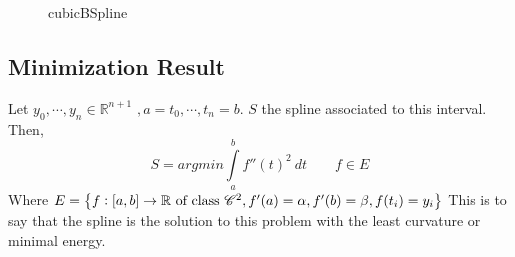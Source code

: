 \begin{figure}[ht]
    \centering
    \caption{cubicBSpline}
    \label{fig:cubicbspline}
\end{figure}

\subsection{Minimization Result}
\label{subsec:Minimization Result}
\begin{ftheo}[]
    Let $ y_0, \cdots, y_n \in \mathbb{R}^{n+1}  $ $, a = t_0, \cdots, t_n = b $. $ S  $
    the spline associated to this interval.  
    Then, 
    \[
    S = argmin \int\limits_{a}^{b} f''(t) ^2 \ dt \qquad f \in E 
    \]
    Where $ E = \set{ f:[a,b] \to \mathbb{R} \text{ of class } \mathscr{ C } ^2, f'(a) =
    \alpha, f'(b) = \beta, f(t_i) = y_i }  $ This is to say that the spline is the
    solution to this problem with the least curvature or minimal energy. 
    \label{th:minResult}
\end{ftheo}
